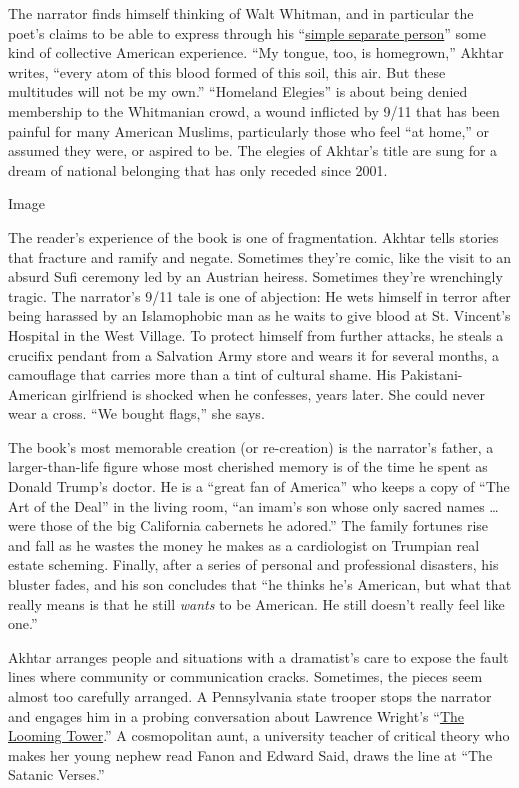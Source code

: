 The narrator finds himself thinking of Walt Whitman, and in particular
the poet's claims to be able to express through his
``\href{https://www.poetryfoundation.org/poems/48857/ones-self-i-sing}{simple
separate person}'' some kind of collective American experience. ``My
tongue, too, is homegrown,'' Akhtar writes, ``every atom of this blood
formed of this soil, this air. But these multitudes will not be my
own.'' ``Homeland Elegies'' is about being denied membership to the
Whitmanian crowd, a wound inflicted by 9/11 that has been painful for
many American Muslims, particularly those who feel ``at home,'' or
assumed they were, or aspired to be. The elegies of Akhtar's title are
sung for a dream of national belonging that has only receded since 2001.

Image

The reader's experience of the book is one of fragmentation. Akhtar
tells stories that fracture and ramify and negate. Sometimes they're
comic, like the visit to an absurd Sufi ceremony led by an Austrian
heiress. Sometimes they're wrenchingly tragic. The narrator's 9/11 tale
is one of abjection: He wets himself in terror after being harassed by
an Islamophobic man as he waits to give blood at St. Vincent's Hospital
in the West Village. To protect himself from further attacks, he steals
a crucifix pendant from a Salvation Army store and wears it for several
months, a camouflage that carries more than a tint of cultural shame.
His Pakistani-American girlfriend is shocked when he confesses, years
later. She could never wear a cross. ``We bought flags,'' she says.

The book's most memorable creation (or re-creation) is the narrator's
father, a larger-than-life figure whose most cherished memory is of the
time he spent as Donald Trump's doctor. He is a ``great fan of America''
who keeps a copy of ``The Art of the Deal'' in the living room, ``an
imam's son whose only sacred names \ldots{} were those of the big
California cabernets he adored.'' The family fortunes rise and fall as
he wastes the money he makes as a cardiologist on Trumpian real estate
scheming. Finally, after a series of personal and professional
disasters, his bluster fades, and his son concludes that ``he thinks
he's American, but what that really means is that he still \emph{wants}
to be American. He still doesn't really feel like one.''

Akhtar arranges people and situations with a dramatist's care to expose
the fault lines where community or communication cracks. Sometimes, the
pieces seem almost too carefully arranged. A Pennsylvania state trooper
stops the narrator and engages him in a probing conversation about
Lawrence Wright's
``\href{https://www.nytimes3xbfgragh.onion/2006/08/01/books/01kaku.html}{The
Looming Tower}.'' A cosmopolitan aunt, a university teacher of critical
theory who makes her young nephew read Fanon and Edward Said, draws the
line at ``The Satanic Verses.''

